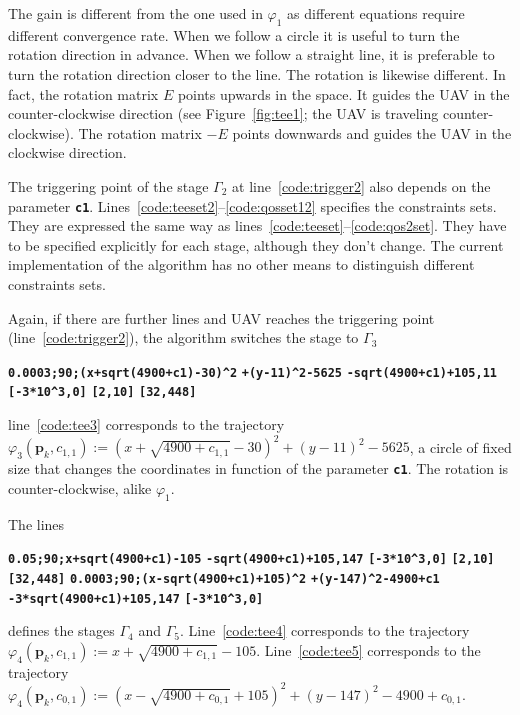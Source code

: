 \documentclass[letterpaper,10pt,conference]{ieeeconf}
\theoremstyle{definition}
\begin{document}
The gain is different from the one used in $\varphi_1$ as different equations require different convergence rate. When we follow a circle it is useful to turn the rotation direction in advance. When we follow a straight line, it is preferable to turn the rotation direction closer to the line. The rotation is likewise different. In fact, the rotation matrix $E$ points upwards in the space. It guides the UAV in the counter-clockwise direction (see Figure~\ref{fig:tee1}; the UAV is traveling counter-clockwise). The rotation matrix $-E$ points downwards and guides the UAV in the clockwise direction.

The triggering point of the stage $\Gamma_2$ at line~\ref{code:trigger2} also depends on the parameter {\tt\textbf{c1}}. Lines~\ref{code:teeset2}--\ref{code:qosset12} specifies the constraints sets. They are expressed the same way as lines~\ref{code:teeset}--\ref{code:qos2set}. They have to be specified explicitly for each stage, although they don't change. The current implementation of the algorithm has no other means to distinguish different constraints sets. 

Again, if there are further lines and UAV reaches the triggering point (line~\ref{code:trigger2}), the algorithm switches the stage to $\Gamma_3$
\begin{algorithmic}[1]
  \State\textbf{\texttt{0.0003;90;(x+sqrt(4900+c1)-30)\^{}2}}
  \textbf{\texttt{\hspace*{14ex}+(y-11)\^{}2-5625}}\label{code:tee3}
  \State\textbf{\texttt{-sqrt(4900+c1)+105,11}}
  \State\textbf{\texttt{[-3*10\^{}3,0]}}
  \State\textbf{\texttt{[2,10]}}
  \State\textbf{\texttt{[32,448]}}\label{code:qosset32}
\end{algorithmic}
line~\ref{code:tee3} corresponds to the trajectory $\varphi_3(\mathbf{p}_k,c_{1,1}):=(x+\sqrt{4900+c_{1,1}}-30)^2+(y-11)^2-5625$, a circle of fixed size that changes the coordinates in function of the parameter {\tt\textbf{c1}}. The rotation is counter-clockwise, alike $\varphi_1$.

The lines
\begin{algorithmic}[1]
  \State\textbf{\texttt{0.05;90;x+sqrt(4900+c1)-105}}\label{code:tee4}
  \State\textbf{\texttt{-sqrt(4900+c1)+105,147}}
  \State\textbf{\texttt{[-3*10\^{}3,0]}}
  \State\textbf{\texttt{[2,10]}}
  \State\textbf{\texttt{[32,448]}}\label{code:qosset42}
  \State\textbf{\texttt{0.0003;90;(x-sqrt(4900+c1)+105)\^{}2}}
  \textbf{\texttt{\hspace*{14ex}+(y-147)\^{}2-4900+c1}}\label{code:tee5}
  \State\textbf{\texttt{-3*sqrt(4900+c1)+105,147}}\label{code:triggerlast}
  \State\textbf{\texttt{[-3*10\^{}3,0]}}\label{code:teeset5}
\end{algorithmic}
defines the stages $\Gamma_4$ and $\Gamma_5$. Line~\ref{code:tee4} corresponds to the trajectory $\varphi_4(\mathbf{p}_k,c_{1,1}):=x+\sqrt{4900+c_{1,1}}-105$. Line~\ref{code:tee5} corresponds to the trajectory $\varphi_4(\mathbf{p}_k,c_{0,1}):=(x-\sqrt{4900+c_{0,1}}+105)^2+(y-147)^2-4900+c_{0,1}$.
\end{document}
